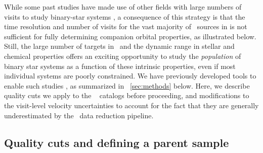 \documentclass[modern]{aastex63}
\begin{document}
While some past studies have made use of other fields with large numbers of
visits to study binary-star systems \citep{Troup:2016, Fernandez-Trincado:2019},
a consequence of this strategy is that the time resolution and number of visits
for the vast majority of \apogee\ sources in  is not sufficient for fully
determining companion orbital properties, as illustrated below.
Still, the large number of targets in \apogee\ and the dynamic range in stellar
and chemical properties offers an exciting opportunity to study the
\emph{population} of binary star systems as a function of these intrinsic
properties, even if most individual systems are poorly constrained.
We have previously developed tools to enable such studies \citep{thejoker}, as
summarized in \sectionname~\ref{sec:methods} below.
Here, we describe quality cuts we apply to the \apogee\  catalogs before
proceeding, and modifications to the visit-level velocity uncertainties to
account for the fact that they are generally underestimated by the \apogee\ data
reduction pipeline.

\subsection{Quality cuts and defining a parent sample}
\end{document}
